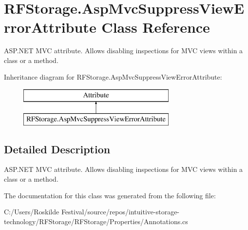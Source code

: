 \section{R\+F\+Storage.\+Asp\+Mvc\+Suppress\+View\+Error\+Attribute Class Reference}
\label{class_r_f_storage_1_1_asp_mvc_suppress_view_error_attribute}


A\+S\+P.\+N\+ET M\+VC attribute. Allows disabling inspections for M\+VC views within a class or a method.  


Inheritance diagram for R\+F\+Storage.\+Asp\+Mvc\+Suppress\+View\+Error\+Attribute\+:\begin{figure}[H]
\begin{center}
\leavevmode
\includegraphics[height=2.000000cm]{class_r_f_storage_1_1_asp_mvc_suppress_view_error_attribute}
\end{center}
\end{figure}


\subsection{Detailed Description}
A\+S\+P.\+N\+ET M\+VC attribute. Allows disabling inspections for M\+VC views within a class or a method. 



The documentation for this class was generated from the following file\+:\begin{DoxyCompactItemize}
\item 
C\+:/\+Users/\+Roskilde Festival/source/repos/intuitive-\/storage-\/technology/\+R\+F\+Storage/\+R\+F\+Storage/\+Properties/Annotations.\+cs\end{DoxyCompactItemize}
